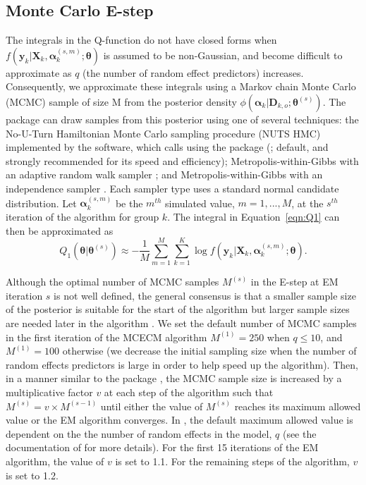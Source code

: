 \subsection{Monte Carlo E-step}
\label{sec:estep}
The integrals in the Q-function do not have closed forms when $f(\boldsymbol y_k | \boldsymbol X_k, \boldsymbol\alpha_k^{(s,m)}; \boldsymbol\theta)$ is assumed to be non-Gaussian, and become difficult to approximate as $q$ (the number of random effect predictors) increases. Consequently, we approximate these integrals using a Markov chain Monte Carlo (MCMC) sample of size M from the posterior density
\(\phi(\boldsymbol \alpha_k | \boldsymbol D_{k,o}; \boldsymbol \theta^{(s)})\).
The  package can draw samples from this posterior using one of
several techniques: the No-U-Turn Hamiltonian Monte Carlo sampling
procedure (NUTS HMC) implemented by the  software, which  calls
using the  package (\cite{stan2017}; default, and strongly
recommended for its speed and efficiency); Metropolis-within-Gibbs with
an adaptive random walk sampler \citep{adaptMCMC2009}; and
Metropolis-within-Gibbs with an independence sampler
\citep{compstats2012}. Each sampler type uses a standard normal
candidate distribution. Let \(\boldsymbol \alpha_k^{(s,m)}\) be the
\(m^{th}\) simulated value, \(m = 1,...,M\), at the \(s^{th}\) iteration
of the algorithm for group \(k\). The integral in Equation~\ref{eqn:Q1} can then be approximated as \begin{equation*}
  Q_1(\boldsymbol\theta | \boldsymbol\theta^{(s)}) \approx - \frac{1}{M} \sum_{m=1}^M \sum_{k=1}^K \log f(\boldsymbol y_k | \boldsymbol X_k, \boldsymbol\alpha_k^{(s,m)}; \boldsymbol\theta).
\end{equation*}

Although the optimal number of MCMC samples  \(M^{(s)}\) in the E-step at EM iteration $s$ 
is not well defined, the general consensus is that a smaller sample size of the posterior is suitable for the start of the algorithm but larger sample sizes are needed later in the algorithm \citep{booth1999}. We set the default number of MCMC samples in the first iteration of the MCECM algorithm \(M^{(1)} = 250\) when \(q \leq 10\), and \(M^{(1)}= 100\) otherwise (we decrease the initial sampling size when the number of random effects predictors is large in order to help speed up the algorithm). Then, in a manner similar to the  package \citep{mcemglm2015},
the MCMC sample size is increased by a multiplicative factor \(v\) at
each step of the algorithm such that \(M^{(s)} = v \times M^{(s-1)}\) until
either the value of \(M^{(s)}\) reaches its maximum allowed value or the
EM algorithm converges. In , the default maximum allowed value is dependent on the the number of random effects in the model, $q$ (see the documentation of  for more details). For the first 15
iterations of the EM algorithm, the value of \(v\) is set to 1.1. For the
remaining steps of the algorithm, \(v\) is set to 1.2.

